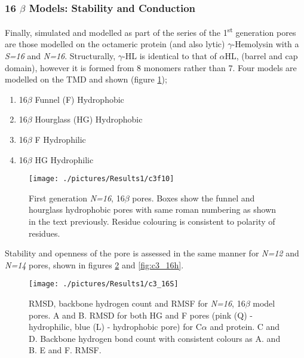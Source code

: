 \subsubsection{16 $\beta$ Models: Stability and Conduction} 

Finally, simulated and modelled as part of the series of the 1\textsuperscript{st} generation pores are those modelled on the octameric protein (and also lytic) $\gamma$-Hemolysin with a \textit{S=16} and \textit{N=16}. Structurally, $\gamma$-HL is identical to that of $\alpha$HL, (barrel and cap domain), however it is formed from 8 monomers rather than 7. Four models are modelled on the TMD and shown (figure \ref{fig:c3f10});
\begin{enumerate}[i]
\setlength\itemsep{0.1em}
  \item 16$\beta$ Funnel (F) Hydrophobic
  \item 16$\beta$ Hourglass (HG) Hydrophobic
  \item 16$\beta$ F Hydrophilic 
  \item 16$\beta$ HG Hydrophilic
\end{enumerate}

\begin{figure}[H]
\begin{center}
\texttt{[image: ./pictures/Results1/c3f10]}
\caption[First generation \textit{N=16}, 16$\beta$ pores.] {First generation \textit{N=16}, 16$\beta$ pores. Boxes show the funnel and hourglass hydrophobic pores with same roman numbering as shown in the text previously. Residue colouring is consistent to polarity of residues.}
\label{fig:c3f10}
\end{center}
\end{figure}

Stability and openness of the pore is assessed in the same manner for \textit{N=12} and \textit{N=14} pores, shown in figures \ref{fig:c3_16S} and \ref{fig:c3_16h}. 

\begin{figure}[H]
\begin{center}
\texttt{[image: ./pictures/Results1/c3\_16S]}
\caption[RMSD, backbone hydrogen count and RMSF for \textit{N=16}, 16$\beta$ model pores.] {RMSD, backbone hydrogen count and RMSF for \textit{N=16}, 16$\beta$ model pores. A and B. RMSD for both HG and F pores (pink (Q) - hydrophilic, blue (L) - hydrophobic pore) for C$\alpha$ and protein. C and D. Backbone hydrogen bond count with consistent colours as A. and B.  E and F. RMSF.}
\label{fig:c3_16S}
\end{center}
\end{figure}


